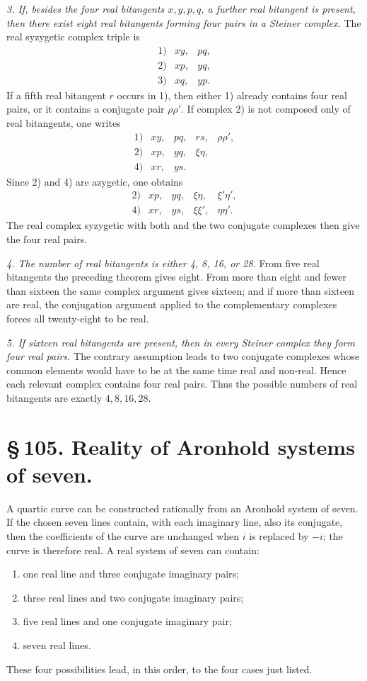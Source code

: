 \documentclass[11pt]{article}
\begin{document}
\emph{3. If, besides the four real bitangents \(x,y,p,q\), a further real bitangent is present, then there exist eight real bitangents forming four pairs in a Steiner complex.} The real syzygetic complex triple is
\[
\begin{array}{rll}
1)&xy,&pq,\\
2)&xp,&yq,\\
3)&xq,&yp.
\end{array}
\]
If a fifth real bitangent \(r\) occurs in 1), then either 1) already contains four real pairs, or it contains a conjugate pair \(\rho\rho'\). If complex 2) is not composed only of real bitangents, one writes
\[
\begin{array}{rllllll}
1)&xy,&pq,&rs,&\rho\rho',\\
2)&xp,&yq,&\xi\eta,\\
4)&xr,&ys.
\end{array}
\]
Since 2) and 4) are azygetic, one obtains
\[
\begin{array}{rllllll}
2)&xp,&yq,&\xi\eta,&\xi'\eta',\\
4)&xr,&ys,&\xi\xi',&\eta\eta'.
\end{array}
\]
The real complex syzygetic with both and the two conjugate complexes then give the four real pairs.

\emph{4. The number of real bitangents is either 4, 8, 16, or 28.} From five real bitangents the preceding theorem gives eight. From more than eight and fewer than sixteen the same complex argument gives sixteen; and if more than sixteen are real, the conjugation argument applied to the complementary complexes forces all twenty-eight to be real.

\emph{5. If sixteen real bitangents are present, then in every Steiner complex they form four real pairs.} The contrary assumption leads to two conjugate complexes whose common elements would have to be at the same time real and non-real. Hence each relevant complex contains four real pairs. Thus the possible numbers of real bitangents are exactly \(4,8,16,28\).

\section*{\S\,105. Reality of Aronhold systems of seven.}

A quartic curve can be constructed rationally from an Aronhold system of seven. If the chosen seven lines contain, with each imaginary line, also its conjugate, then the coefficients of the curve are unchanged when \(i\) is replaced by \(-i\); the curve is therefore real. A real system of seven can contain:
\begin{enumerate}[label=\arabic*)]
\item one real line and three conjugate imaginary pairs;
\item three real lines and two conjugate imaginary pairs;
\item five real lines and one conjugate imaginary pair;
\item seven real lines.
\end{enumerate}
These four possibilities lead, in this order, to the four cases just listed.
\end{document}
